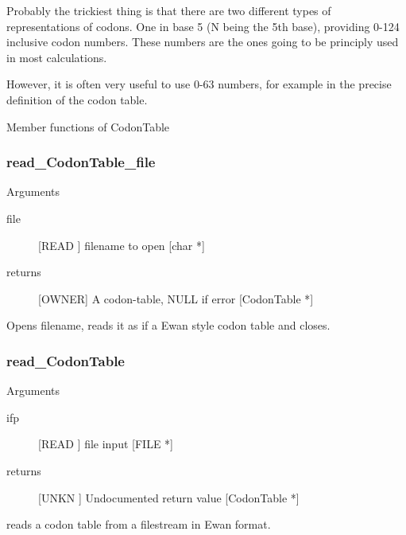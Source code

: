 Probably the trickiest thing is that there are two different types of
representations of codons. One in base 5 (N being the 5th base),
providing 0-124 inclusive codon numbers.  These numbers are the ones
going to be principly used in most calculations.


However, it is often very useful to use 0-63 numbers, for example 
in the precise definition of the codon table. 




Member functions of CodonTable

\subsubsection{read_CodonTable_file}

Arguments
\begin{description}
\item[file] [READ ] filename to open [char *]
\item[returns] [OWNER] A codon-table, NULL if error [CodonTable *]
\end{description}
Opens filename, reads it as if a Ewan style
codon table and closes.


\subsubsection{read_CodonTable}

Arguments
\begin{description}
\item[ifp] [READ ] file input [FILE *]
\item[returns] [UNKN ] Undocumented return value [CodonTable *]
\end{description}
reads a codon table from a filestream in Ewan
format.


